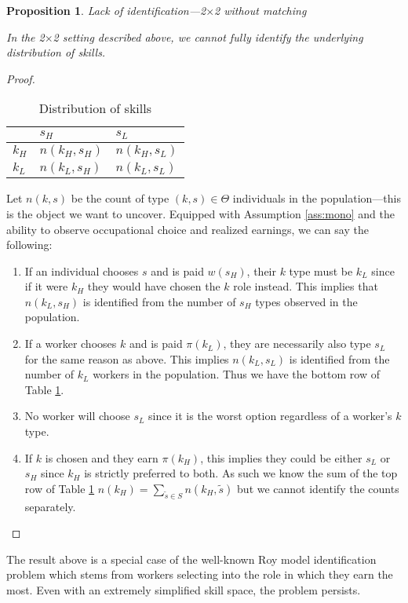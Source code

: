 \documentclass[12 pt]{article}
\newtheorem{proposition}{Proposition} %
\begin{document}
\begin{proposition}{Lack of identification---2$\times$2 without matching}
	
	In the 2$\times$2 setting described above, we cannot fully identify the underlying distribution of skills.
	\label{prop:identnomatch}
\end{proposition}
\begin{proof}
\begin{table}[H]
	\centering
	\begin{tabular}{l|ll}
		& $s_H$        & $s_L$        \\ \hline
		$k_H$ & $n(k_H,s_H)$ & $n(k_H,s_L)$ \\
		$k_L$ & $n(k_L,s_H)$ & $n(k_L,s_L)$
		
	\end{tabular}
	\caption{Distribution of skills}
	\label{tab:2by2counts}
\end{table}
Let $n(k,s)$ be the count of type $(k,s)\in \Theta$ individuals in the population---this is the object we want to uncover. Equipped with Assumption \ref{ass:mono} and the ability to observe occupational choice and realized earnings, we can say the following:
\begin{enumerate}
	\item If an individual chooses $s$ and is paid $w(s_H)$, their $k$ type must be $k_L$ since if it were $k_H$ they would have chosen the $k$ role instead. This implies that $n(k_L,s_H)$ is identified from the number of $s_H$ types observed in the population.
	\item If a worker chooses $k$ and is paid $\pi(k_L)$, they are necessarily also type $s_L$ for the same reason as above. This implies $n(k_L,s_L)$ is identified from the number of $k_L$ workers in the population. Thus we have the bottom row of Table \ref{tab:2by2counts}.
	\item No worker will choose $s_L$ since it is the worst option regardless of a worker's $k$ type.
	\item If $k$ is chosen and they earn $\pi(k_H)$, this implies they could be either $s_L$ or $s_H$ since $k_H$ is strictly preferred to both. As such we know the sum of the top row of Table \ref{tab:2by2counts} $n(k_H)=\sum_{\tilde{s}\in S}n(k_H,\tilde{s})$ but we cannot identify the counts separately.
\end{enumerate}
\end{proof}
The result above is a special case of the well-known Roy model identification problem which stems from workers selecting into the role in which they earn the most. Even with an extremely simplified skill space, the problem persists. 
\end{document}

